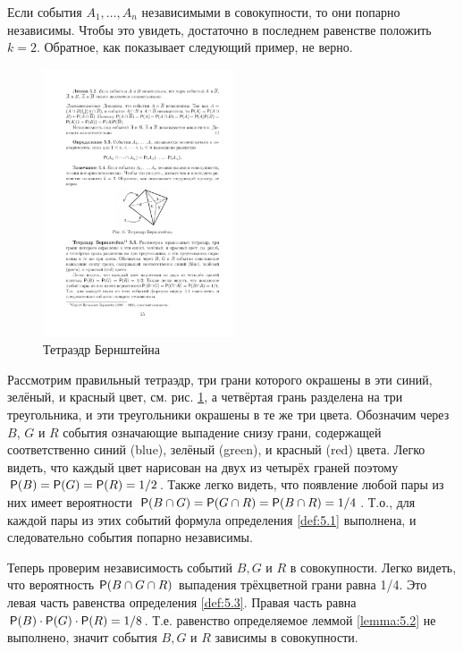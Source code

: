 \begin{zam} 
\label{zam:5.4}
Если события $A_1, \dots ,A_n$ независимыми в совокупности,
то они попарно независимы. Чтобы это увидеть, достаточно в последнем равенстве положить $k = 2$. Обратное, как показывает следующий пример, не верно.
\end{zam}

\begin{figure}[H]
	\centering
	\includegraphics[width=0.5\textwidth]{pic/pic6.pdf}
	\caption{Тетраэдр Бернштейна}
	\label{pic:6}
\end{figure}

\begin{example}
\label{ex:5.5}

Рассмотрим правильный тетраэдр, три грани которого окрашены в эти синий, зелёный, и красный цвет, см. рис. \ref{pic:6},
а четвёртая грань разделена на три треугольника, и эти треугольники окрашены в те же три цвета. Обозначим через $B$, $G$ и $R$ события означающие выпадение снизу грани, содержащей соответственно синий (blue), зелёный
(green), и красный (red) цвета.
Легко видеть, что каждый цвет нарисован на двух из четырёх граней
поэтому $\P(B) = \P(G) = \P(R) = 1/2$. Также легко видеть, что появление
любой пары из них имеет вероятности $\P(B\cap G) = \P(G\cap R) = \P(B\cap R) = 1/4$.
Т.о., для каждой пары из этих событий формула определения \ref{def:5.1} выполнена, и
следовательно события попарно независимы.

Теперь проверим независимость событий $B, G$ и $R$ в совокупности. Легко
видеть, что вероятность $\P(B \cap  G \cap  R)$ выпадения трёхцветной грани равна
1/4. Это левая часть равенства определения \ref{def:5.3}. Правая часть равна $\P(B) \cdot \P(G) \cdot
\P(R) = 1/8$. Т.е. равенство определяемое леммой \ref{lemma:5.2} не выполнено, значит события $B, G$
и $R$ зависимы в совокупности.
\end{example}



